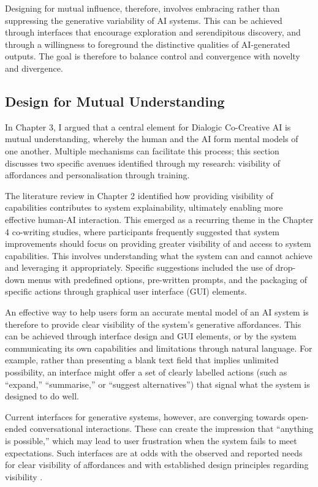 Designing for mutual influence, therefore, involves embracing rather than suppressing the generative variability of AI systems. This can be achieved through interfaces that encourage exploration and serendipitous discovery, and through a willingness to foreground the distinctive qualities of AI-generated outputs. The goal is therefore to balance control and convergence with novelty and divergence.

\subsection{Design for Mutual Understanding}

In Chapter 3, I argued that a central element for Dialogic Co-Creative AI is mutual understanding, whereby the human and the AI form mental models of one another. Multiple mechanisms can facilitate this process; this section discusses two specific avenues identified through my research: visibility of affordances and personalisation through training.

The literature review in Chapter 2 identified how providing visibility of capabilities contributes to system explainability, ultimately enabling more effective human-AI interaction. This emerged as a recurring theme in the Chapter 4 co-writing studies, where participants frequently suggested that system improvements should focus on providing greater visibility of and access to system capabilities. This involves understanding what the system can and cannot achieve and leveraging it appropriately. Specific suggestions included the use of drop-down menus with predefined options, pre-written prompts, and the packaging of specific actions through graphical user interface (GUI) elements.

An effective way to help users form an accurate mental model of an AI system is therefore to provide clear visibility of the system's generative affordances. This can be achieved through interface design and GUI elements, or by the system communicating its own capabilities and limitations through natural language. For example, rather than presenting a blank text field that implies unlimited possibility, an interface might offer a set of clearly labelled actions (such as ``expand,'' ``summarise,'' or ``suggest alternatives'') that signal what the system is designed to do well.

Current interfaces for generative systems, however, are converging towards open-ended conversational interactions. These can create the impression that ``anything is possible,'' which may lead to user frustration when the system fails to meet expectations. Such interfaces are at odds with the observed and reported needs for clear visibility of affordances and with established design principles regarding visibility \citep{Nielsen1994-df}.

